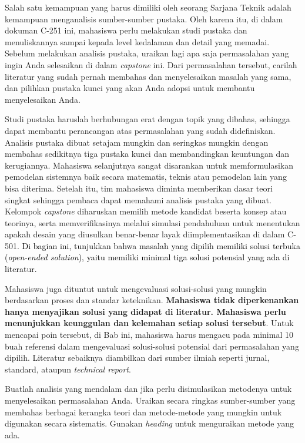 

Salah satu kemampuan yang harus dimiliki oleh seorang Sarjana Teknik adalah kemampuan menganalisis sumber-sumber pustaka. Oleh karena itu, di dalam dokuman C-251 ini, mahasiswa perlu melakukan studi pustaka dan menuliskannya sampai kepada level kedalaman dan detail yang memadai. Sebelum melakukan analisis pustaka, uraikan lagi apa saja permasalahan yang ingin Anda selesaikan di dalam \textit{capstone} ini. Dari permasalahan tersebut, carilah literatur yang sudah pernah membahas dan menyelesaikan masalah yang sama, dan pilihkan pustaka kunci yang akan Anda adopsi untuk membantu menyelesaikan Anda.

Studi pustaka haruslah berhubungan erat dengan topik yang dibahas, sehingga dapat membantu perancangan atas permasalahan yang sudah didefiniskan. Analisis pustaka dibuat setajam mungkin dan seringkas mungkin dengan membahas sedikitnya tiga pustaka kunci dan membandingkan keuntungan dan kerugiannya. Mahasiswa selanjutnya sangat disarankan untuk memformulasikan pemodelan sistemnya baik secara matematis, teknis atau pemodelan lain yang bisa diterima. Setelah itu, tim mahasiswa diminta memberikan dasar teori singkat sehingga pembaca dapat memahami analisis pustaka yang dibuat. Kelompok \textit{capstone} diharuskan memilih metode kandidat beserta konsep atau teorinya, serta memverifikasinya melalui simulasi pendahuluan untuk menentukan apakah desain yang diusulkan benar-benar layak diimplementasikan di dalam C-501. \textcolor{black}{Di bagian ini, tunjukkan bahwa masalah yang dipilih memiliki solusi terbuka (\textit{open-ended solution}), yaitu memiliki minimal tiga solusi potensial yang ada di literatur.}

Mahasiswa juga dituntut untuk mengevaluasi solusi-solusi yang mungkin berdasarkan proses dan standar keteknikan. \textbf{Mahasiswa tidak diperkenankan hanya menyajikan solusi yang didapat di literatur. Mahasiswa perlu menunjukkan keunggulan dan kelemahan setiap solusi tersebut}. Untuk mencapai poin tersebut, di Bab ini, mahasiswa harus mengacu pada minimal 10 buah referensi dalam mengevaluasi solusi-solusi potensial dari permasalahan yang dipilih. Literatur sebaiknya diambilkan dari sumber ilmiah seperti jurnal, standard, ataupun \textit{technical report}.

Buatlah analisis yang mendalam dan jika perlu disimulasikan metodenya untuk menyelesaikan permasalahan Anda. Uraikan secara ringkas sumber-sumber yang membahas berbagai kerangka teori dan metode-metode yang mungkin untuk digunakan secara sistematis. Gunakan \textit{heading} untuk menguraikan metode yang ada.
\vspace{6pt}

